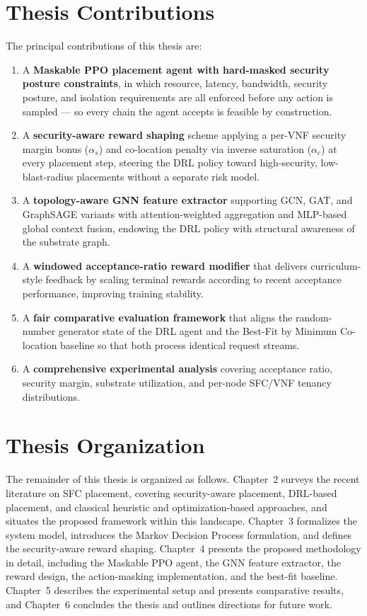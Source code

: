 \section{Thesis Contributions}

The principal contributions of this thesis are:

\begin{enumerate}
  \item A \textbf{Maskable PPO placement agent with hard-masked
  security posture constraints}, in which resource, latency,
  bandwidth, security posture, and isolation requirements are all
  enforced before any action is sampled --- so every chain the agent
  accepts is feasible by construction.
  \item A \textbf{security-aware reward shaping} scheme applying a
  per-VNF security margin bonus ($\alpha_s$) and co-location penalty
  via inverse saturation ($\alpha_c$) at every placement step,
  steering the DRL policy toward high-security, low-blast-radius
  placements without a separate risk model.
  \item A \textbf{topology-aware GNN feature extractor} supporting
  GCN, GAT, and GraphSAGE variants with attention-weighted aggregation
  and MLP-based global context fusion, endowing the DRL policy with
  structural awareness of the substrate graph.
  \item A \textbf{windowed acceptance-ratio reward modifier} that
  delivers curriculum-style feedback by scaling terminal rewards
  according to recent acceptance performance, improving training
  stability.
  \item A \textbf{fair comparative evaluation framework} that aligns
  the random-number generator state of the DRL agent and the
  Best-Fit by Minimum Co-location baseline so that both process identical
  request streams.
  \item A \textbf{comprehensive experimental analysis} covering
  acceptance ratio, security margin, substrate utilization, and
  per-node SFC/VNF tenancy distributions.
\end{enumerate}

\section{Thesis Organization}

The remainder of this thesis is organized as follows.
Chapter~2 surveys the recent literature on SFC placement, covering
security-aware placement, DRL-based placement, and classical heuristic
and optimization-based approaches, and situates the proposed framework
within this landscape. Chapter~3 formalizes the system model,
introduces the Markov Decision Process formulation, and defines the
security-aware reward shaping. Chapter~4 presents the proposed
methodology in detail, including the Maskable PPO agent, the GNN
feature extractor, the reward design, the action-masking
implementation, and the best-fit baseline. Chapter~5 describes the
experimental setup and presents comparative results, and Chapter~6
concludes the thesis and outlines directions for future work.
